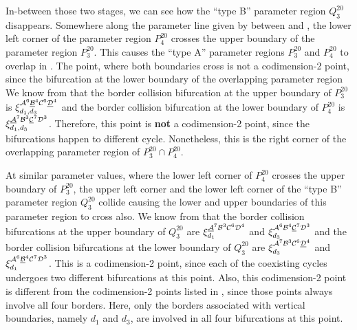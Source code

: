 In-between those two stages, we can see how the ``type B'' parameter region $Q^{20}_3$ disappears.
Somewhere along the parameter line given by  between  and , the lower left corner of the parameter region $P^{20}_4$ crosses the upper boundary of the parameter region $P^{20}_3$.
This causes the ``type A'' parameter regions $P^{20}_3$ and $P^{20}_4$ to overlap in .
The point, where both boundaries cross is not a codimension-2 point, since the bifurcation at the lower boundary of the overlapping parameter region
We know from  that the border collision bifurcation at the upper boundary of $P^{20}_3$ is $\xi_{d_1, d_3}^{\mathcal{A}^6\underline{\mathcal{B}}^4\mathcal{C}^6\underline{\mathcal{D}}^4}$ and the border collision bifurcation at the lower boundary of $P^{20}_4$ is $\xi_{d_1, d_3}^{\underline{\mathcal{A}}^7\mathcal{B}^3\underline{\mathcal{C}}^7\mathcal{D}^3}$.
Therefore, this point is \textbf{not} a codimension-2 point, since the bifurcations happen to different cycle.
Nonetheless, this is the right corner of the overlapping parameter region of $P^{20}_3 \cap P^{20}_4$.

At similar parameter values, where the lower left corner of $P^{20}_4$ crosses the upper boundary of $P^{20}_3$, the upper left corner and the lower left corner of the ``type B'' parameter region $Q^{20}_3$ collide causing the lower and upper boundaries of this parameter region to cross also.
We know from  that the border collision bifurcations at the upper boundary of $Q^{20}_3$ are $\xi_{d_1}^{\underline{\mathcal{A}}^7\mathcal{B}^3\mathcal{C}^6\mathcal{D}^4}$ and $\xi_{d_3}^{\mathcal{A}^6\mathcal{B}^4\underline{\mathcal{C}}^7\mathcal{D}^3}$ and the border collision bifurcations at the lower boundary of $Q^{20}_3$ are $\xi_{d_3}^{\mathcal{A}^7\mathcal{B}^3\mathcal{C}^6\underline{\mathcal{D}}^4}$ and $\xi_{d_1}^{\mathcal{A}^6\underline{\mathcal{B}}^4\mathcal{C}^7\mathcal{D}^3}$.
This is a codimension-2 point, since each of the coexisting cycles undergoes two different bifurcations at this point.
Also, this codimension-2 point is different from the codimension-2 points listed in , since those points always involve all four borders.
Here, only the borders associated with vertical boundaries, namely $d_1$ and $d_3$, are involved in all four bifurcations at this point.


